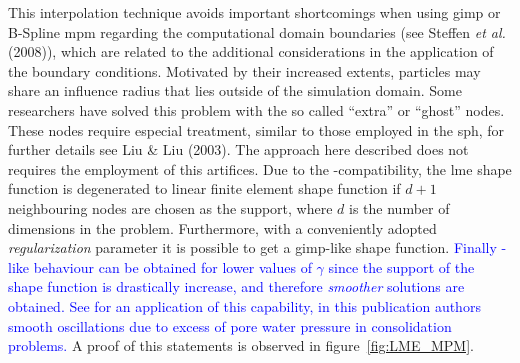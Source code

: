 \documentclass[preprint,12pt,a4paper]{elsarticle}
\newcommand{\MMP}[1]{
  \textcolor{blue}{{#1}}
}
\begin{document}
This interpolation technique avoids important shortcomings when using
\acrshort{gimp} or B-Spline \acrshort{mpm} regarding the computational domain boundaries
(see Steffen {\it et al.} (2008)\cite{Steffen2008b}), which are related to the
additional considerations in the application of the boundary
conditions. Motivated by their increased extents, particles may share an influence radius that lies outside of the simulation domain. Some researchers have solved this problem with the so called ``extra'' or ``ghost'' nodes. These nodes require especial treatment, similar
to those employed in the \acrfull{sph}, for
further details see Liu \& Liu (2003)\cite{Liu2003}. The approach here
described does not requires the employment of this artifices.
Due to the -compatibility, the \acrshort{lme} shape
function is degenerated to linear finite element shape function if
$d+1$ neighbouring nodes are chosen as the support, where $d$ is the
number of dimensions in the problem. Furthermore, with a conveniently
adopted \textit{regularization} parameter it is possible to get a 
\acrshort{gimp}-like shape function.\MMP{Finally -like
behaviour can be obtained for lower values of $\gamma$ since the
support of the shape function is drastically increase, and therefore
\textit{smoother} solutions are obtained. See \cite{Navas2016} for an
application of this capability, in this publication authors smooth 
oscillations due to excess of pore water pressure in consolidation
problems.}A proof of this statements is observed in figure~\ref{fig:LME_MPM}.
\end{document}
